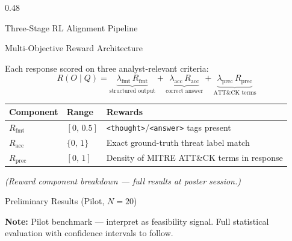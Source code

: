\documentclass[final]{beamer}
\newcommand{\vsep}{\vspace{1.2em}}
\begin{document}
\begin{frame}[t]{}
\begin{columns}[T]
\begin{column}{0.48\linewidth}
\begin{block}{Three-Stage RL Alignment Pipeline}
\end{block}

\vsep

\begin{exampleblock}{Multi-Objective Reward Architecture}

Each response scored on three analyst-relevant criteria:
\[
  R(O \mid Q)=
    \underbrace{\lambda_\text{fmt}\,R_\text{fmt}}_{\text{structured output}}
  +\underbrace{\lambda_\text{acc}\,R_\text{acc}}_{\text{correct answer}}
  +\underbrace{\lambda_\text{prec}\,R_\text{prec}}_{\text{ATT\&CK terms}}
\]

\begin{center}
\begin{tabular}{lll}
  \toprule
  \textbf{Component} & \textbf{Range} & \textbf{Rewards} \\
  \midrule
  $R_\text{fmt}$  & $[0,\,0.5]$ & \texttt{<thought>}/\texttt{<answer>} tags present \\
  $R_\text{acc}$  & $\{0,\,1\}$ & Exact ground-truth threat label match \\
  $R_\text{prec}$ & $[0,\,1]$   & Density of MITRE ATT\&CK terms in response \\
  \bottomrule
\end{tabular}
\end{center}

\smallskip
\textit{(Reward component breakdown --- full results at poster session.)}

\end{exampleblock}

\vsep

\begin{block}{Preliminary Results \textnormal{(Pilot, $N\!=\!20$)}}

\small\textbf{Note:} Pilot benchmark --- interpret as feasibility signal.
Full statistical evaluation with confidence intervals to follow.

\vsep


\end{block}
\end{column}
\end{columns}
\end{frame}
\end{document}
